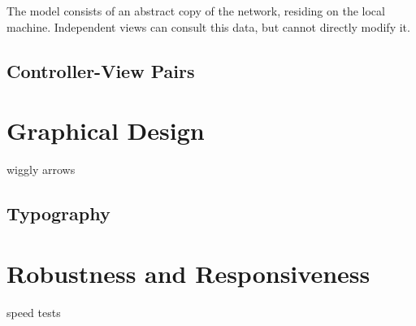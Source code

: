 	The model consists of an abstract copy of the network, residing on the local machine. Independent views can consult this data, but cannot directly modify it.

\subsection{Controller-View Pairs}

\section{Graphical Design}
	wiggly arrows
\subsection{Typography}
	
\section{Robustness and Responsiveness}
	speed tests
